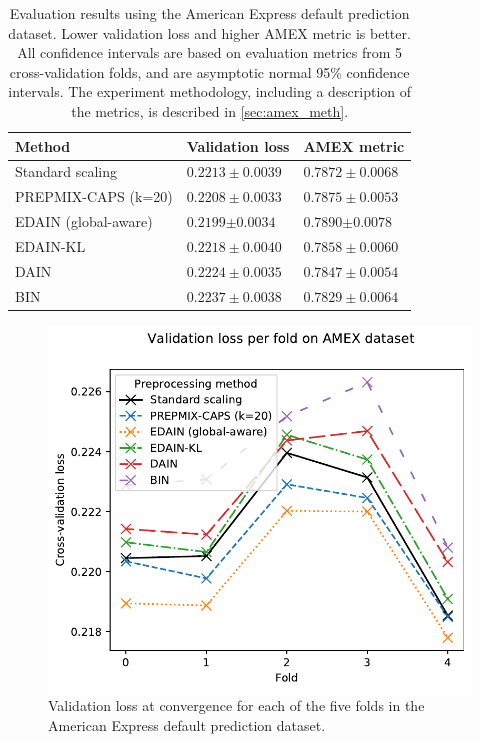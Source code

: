 \documentclass{statsmsc}
\begin{document}
{%
\begin{table}[htp]
    \centering
    \begin{tabular}{lll}
        \toprule
        Method & Validation loss & AMEX metric \\
        \midrule
        Standard scaling & $0.2213 \pm 0.0039$ & $0.7872 \pm 0.0068$ \\
        PREPMIX-CAPS (k=20) & $0.2208 \pm 0.0033$ & $0.7875 \pm 0.0053$ \\
        EDAIN (global-aware) & $\mathbf{0.2199} \bm\pm \mathbf{0.0034}$ & $\mathbf{0.7890} \bm\pm \mathbf{0.0078}$ \\
        EDAIN-KL & $0.2218 \pm 0.0040$ & $0.7858 \pm 0.0060$ \\
        DAIN & $0.2224 \pm 0.0035$ & $0.7847 \pm 0.0054$ \\
        BIN & $0.2237 \pm 0.0038$ & $0.7829 \pm 0.0064$ \\
        \bottomrule
    \end{tabular}%
    \label{tab:amex_performance}%
    \caption{
        Evaluation results using the American Express default prediction dataset. Lower validation
        loss and higher AMEX metric is better.
        All confidence intervals are based on evaluation metrics from 5 cross-validation folds,
        and are asymptotic normal 95\% confidence intervals.
        The experiment methodology, including a description of the metrics,
        is described in  \cref{sec:amex_meth}.
    }
\end{table}

\begin{figure}[htp]
    \begin{center}
        \includegraphics[scale=1]{figures/amex_performance_convergence_per_fold}
    \end{center}
    \caption{Validation loss at convergence for each of the five folds in the American Express
    default prediction dataset.}
    \label{fig:amex_folds}
\end{figure}

}
\end{document}

